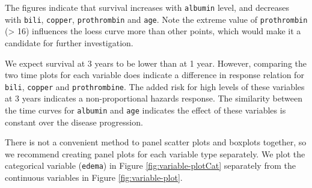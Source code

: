 \documentclass[article]{jss}
\begin{document}
The figures indicate that survival increases with \texttt{albumin}
level, and decreases with \texttt{bili}, \texttt{copper},
\texttt{prothrombin} and \texttt{age}. Note the extreme value of
\texttt{prothrombin} (\textgreater{} 16) influences the loess curve more
than other points, which would make it a candidate for further
investigation.

We expect survival at 3 years to be lower than at 1 year. However,
comparing the two time plots for each variable does indicate a
difference in response relation for \texttt{bili}, \texttt{copper} and
\texttt{prothrombine}. The added risk for high levels of these variables
at 3 years indicates a non-proportional hazards response. The similarity
between the time curves for \texttt{albumin} and \texttt{age} indicates
the effect of these variables is constant over the disease progression.

There is not a convenient method to panel scatter plots and boxplots
together, so we recommend creating panel plots for each variable type
separately. We plot the categorical variable (\texttt{edema}) in Figure
\ref{fig:variable-plotCat} separately from the continuous variables in
Figure \ref{fig:variable-plot}.
\end{document}
